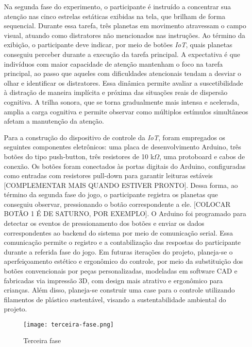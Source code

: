Na segunda fase do experimento, o participante é instruído a concentrar sua atenção nas cinco estrelas estáticas exibidas na tela, que brilham de forma sequencial. Durante essa tarefa, três planetas em movimento atravessam o campo visual, atuando como distratores não mencionados nas instruções. Ao término da exibição, o participante deve indicar, por meio de botões \textit{IoT}, quais planetas conseguiu perceber durante a execução da tarefa principal.
A expectativa é que indivíduos com maior capacidade de atenção mantenham o foco na tarefa principal, ao passo que aqueles com dificuldades atencionais tendam a desviar o olhar e identificar os distratores. Essa dinâmica permite avaliar a suscetibilidade à distração de maneira implícita e próxima das situações reais de dispersão cognitiva.
A trilha sonora, que se torna gradualmente mais intensa e acelerada, amplia a carga cognitiva e permite observar como múltiplos estímulos simultâneos afetam a manutenção da atenção.

Para a construção do dispositivo de controle da \textit{IoT}, foram empregados os seguintes componentes eletrônicos: uma placa de desenvolvimento Arduino, três botões do tipo push-button, três resistores de 10 k$\Omega$, uma protoboard e cabos de conexão. Os botões foram conectados às portas digitais do Arduino, configuradas como entradas com resistores pull-down para garantir leituras estáveis [COMPLEMENTAR MAIS QUANDO ESTIVER PRONTO]. Dessa forma, ao término da segunda fase do jogo, o participante registra os planetas que conseguiu observar, pressionando o botão correspondente a ele. [COLOCAR BOTÃO 1 É DE SATURNO, POR EXEMPLO]. O Arduino foi programado para detectar os eventos de pressionamento dos botões e enviar os dados correspondentes ao backend do sistema por meio de comunicação serial. Essa comunicação permite o registro e a contabilização das respostas do participante durante a referida fase do jogo. Em futuras iterações do projeto, planeja-se o aperfeiçoamento estético e ergonômico do controle, por meio da substituição dos botões convencionais por peças personalizadas, modeladas em software CAD e fabricadas via impressão 3D, com design mais atrativo e ergonômico para crianças. Além disso, planeja-se construir uma case para o controle utilizando filamentos de plástico sustentável, visando a sustentabilidade ambiental do projeto.

\begin{figure}[H]
    \centering
    \caption{Terceira fase}%
    \label{fig:terceira-fase}
    \texttt{[image: terceira-fase.png]}%
\end{figure}

